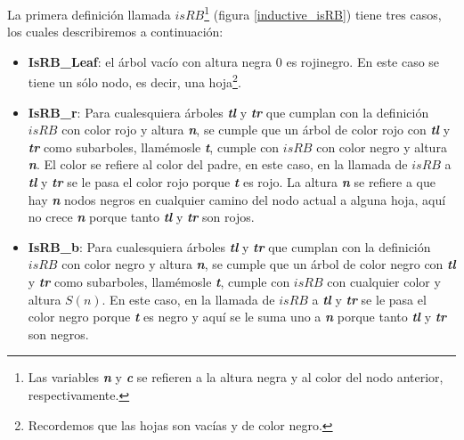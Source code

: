 La primera definici\'on llamada \hyperref[inductive_isRB]{$isRB$}\footnote{Las variables \textit{\textbf{n}} y \textit{\textbf{c}} se refieren a la altura negra y al color del nodo anterior, respectivamente.} (figura \ref{inductive_isRB}) 
tiene tres casos, los cuales describiremos a continuaci\'on:
\begin{itemize}
        \item \textbf{IsRB\_Leaf}: el árbol vacío con altura negra 0 es rojinegro. En este caso
        se tiene un s\'olo nodo, es decir, una hoja\footnote{Recordemos que las hojas son vac\'ias y de
        color negro.}.
        \item \textbf{IsRB\_r}: Para cualesquiera \'arboles \textbf{\textit{tl}} y 
        \textbf{\textit{tr}} que cumplan con la definici\'on \hyperref[inductive_isRB]{$isRB$} con 
        color rojo y altura \textbf{\textit{n}}, se cumple que un \'arbol de color rojo con 
        \textbf{\textit{tl}} y \textbf{\textit{tr}} como subarboles, llam\'emosle \textbf{\textit{t}}, cumple 
        con \hyperref[inductive_isRB]{$isRB$} con color negro y altura \textbf{\textit{n}}. El color 
        se refiere al color del padre, en este caso, en la llamada de 
        \hyperref[inductive_isRB]{$isRB$} a \textbf{\textit{tl}} y \textbf{\textit{tr}} se le pasa 
        el color rojo porque \textbf{\textit{t}} es rojo. La altura \textbf{\textit{n}} se refiere a 
        que hay \textbf{\textit{n}} nodos negros en cualquier camino del nodo actual a alguna hoja, 
        aqu\'i no crece \textbf{\textit{n}} porque tanto
        \textbf{\textit{tl}} y \textbf{\textit{tr}} son rojos.
        \item \textbf{IsRB\_b}: Para cualesquiera \'arboles \textbf{\textit{tl}} y 
        \textbf{\textit{tr}} que cumplan con la definici\'on \hyperref[inductive_isRB]{$isRB$} con 
        color negro y altura \textbf{\textit{n}}, se cumple que un \'arbol de color negro con 
        \textbf{\textit{tl}} y \textbf{\textit{tr}} como subarboles, llam\'emosle \textbf{\textit{t}}, cumple 
        con \hyperref[inductive_isRB]{$isRB$} con cualquier color y altura $S(n)$. En este caso, en 
        la llamada de \hyperref[inductive_isRB]{$isRB$} a \textbf{\textit{tl}} y 
        \textbf{\textit{tr}} se le pasa el color negro porque \textbf{\textit{t}} es negro y aqu\'i se 
        le suma uno a \textbf{\textit{n}} porque tanto \textbf{\textit{tl}} y \textbf{\textit{tr}} 
        son negros.
\end{itemize}

